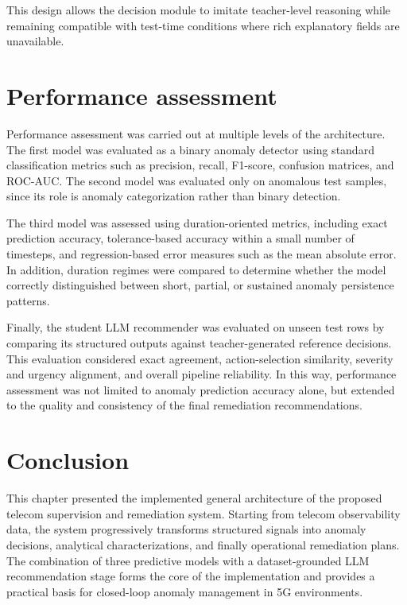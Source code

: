 This design allows the decision module to imitate teacher-level reasoning while remaining compatible with test-time conditions where rich explanatory fields are unavailable.

\section{Performance assessment}
Performance assessment was carried out at multiple levels of the architecture. The first model was evaluated as a binary anomaly detector using standard classification metrics such as precision, recall, F1-score, confusion matrices, and ROC-AUC. The second model was evaluated only on anomalous test samples, since its role is anomaly categorization rather than binary detection.

The third model was assessed using duration-oriented metrics, including exact prediction accuracy, tolerance-based accuracy within a small number of timesteps, and regression-based error measures such as the mean absolute error. In addition, duration regimes were compared to determine whether the model correctly distinguished between short, partial, or sustained anomaly persistence patterns.

Finally, the student LLM recommender was evaluated on unseen test rows by comparing its structured outputs against teacher-generated reference decisions. This evaluation considered exact agreement, action-selection similarity, severity and urgency alignment, and overall pipeline reliability. In this way, performance assessment was not limited to anomaly prediction accuracy alone, but extended to the quality and consistency of the final remediation recommendations.

\section{Conclusion}
This chapter presented the implemented general architecture of the proposed telecom supervision and remediation system. Starting from telecom observability data, the system progressively transforms structured signals into anomaly decisions, analytical characterizations, and finally operational remediation plans. The combination of three predictive models with a dataset-grounded LLM recommendation stage forms the core of the implementation and provides a practical basis for closed-loop anomaly management in 5G environments.
